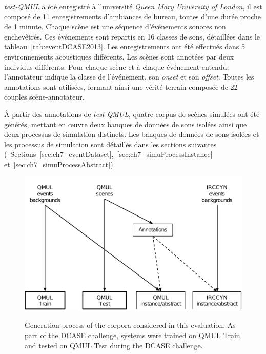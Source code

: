 \emph{test-QMUL} a été enregistré à l'université \emph{Queen Mary University of London}, il est composé de 11 enregistrements d'ambiances de bureau, toutes d'une durée proche de 1 minute. Chaque scène est une séquence  d'événements sonores non enchevêtrés. Ces événements sont repartis en 16 classes de sons, détaillées dans le tableau~\ref{tab:eventDCASE2013}. Les enregistrements ont été effectués dans 5 environnements acoustiques différents. Les scènes sont annotées par deux individus différents. Pour chaque scène et à chaque événement entendu, l'annotateur indique la classe de l'événement, son \emph{onset} et son \emph{offset}.  Toutes les annotations sont utilisées, formant ainsi une vérité terrain composée de 22 couples scène-annotateur.


À partir des annotations de \emph{test-QMUL}, quatre corpus de scènes simulées ont été générés, mettant en œuvre deux banques de données de sons isolées ainsi que deux processus de simulation distincts. Les banques de données de sons isolées et les processus de simulation sont détaillés dans les sections suivantes (\cf~Sections~\ref{sec:ch7_eventDataset},~\ref{sec:ch7_simuProcessInstance} et~\ref{sec:ch7_simuProcessAbstract}). \\


\begin{figure}[t]
\begin{center}
\includegraphics[width=1\textwidth]{gfxML/databasesTasslp.pdf}
\label{fig:databasesDCASE2013Simu}
\caption{Generation process of the corpora considered in this evaluation. As part of the DCASE challenge, systems were trained on QMUL Train and tested on QMUL Test during the DCASE challenge.} 
\end{center}
\end{figure}

